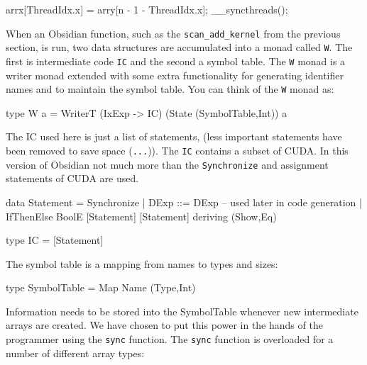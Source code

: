 \begin{code}
arrx[ThreadIdx.x] = arry[n - 1 - ThreadIdx.x];  
__syncthreads();
\end{code} 

When an Obsidian function, such as the {\tt scan\_add\_kernel} from the 
previous section, is run, two data structures are accumulated into a monad 
called {\tt W}. The first is intermediate code {\tt IC} and the second a symbol 
table. The {\tt W} monad is a writer monad extended with some extra 
functionality for generating identifier names and to maintain the symbol table. 
You can think of the {\tt W} monad as: 

\begin{code}
type W a = WriterT (IxExp -> IC) (State (SymbolTable,Int)) a
\end{code}

The IC used here is just a list of statements, (less important statements have 
been removed to save space ({\tt ...})). The {\tt IC} contains a 
subset of CUDA. In this version of Obsidian not much more than the 
{\tt Synchronize} and assignment statements of CUDA are used. 

\begin{code} 
data Statement = Synchronize 
               | DExp ::= DExp 
               -- used later in code generation
               | IfThenElse BoolE [Statement] [Statement]
                 deriving (Show,Eq)

type IC = [Statement]
\end{code} 

The symbol table is a mapping from names to types and sizes: 
\begin{code} 
type SymbolTable = Map Name (Type,Int) 
\end{code}

Information needs to be stored into the SymbolTable whenever new intermediate
arrays are created. We have chosen to put this power in the hands of the programmer
using the {\tt sync} function. The {\tt sync} function is overloaded for 
a number of different array types: 


